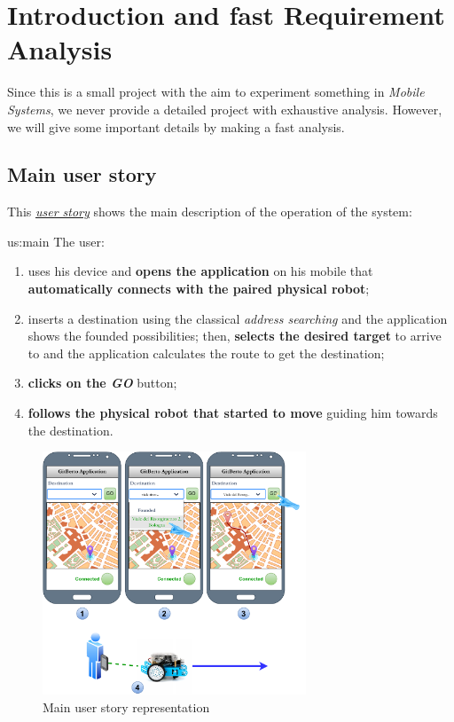 \section{Introduction and fast Requirement Analysis}

Since this is a small project with the aim to experiment something in \textit{Mobile Systems}, we never provide a detailed project with exhaustive analysis. However, we will give some important details by making a fast analysis.

\subsection{Main user story}

This \href{https://en.wikipedia.org/wiki/User_story}{\textit{user story}} shows the main description of the operation of the system:

\hspace{10pt}
\begin{center}
	\begin{userstory}{us:main}
		The user:
		\begin{enumerate}
			\item uses his device and \textbf{opens the \gitberto application} on his mobile that \textbf{automatically connects with the paired physical robot}; 
			\item inserts a destination using the classical \textit{address searching} and the application shows the founded possibilities; then, \textbf{selects the desired target} to arrive to and the application calculates the route to get the destination;
			\item \textbf{clicks on the \textit{GO}} button;
			\item  \textbf{follows the physical \gitberto robot that started to move} guiding him towards the destination.
		\end{enumerate}
		
	\end{userstory}
\end{center}
\begin{figure}[h!]
	\centering
	\includegraphics[width=0.7\textwidth]{img/user_story_main.pdf}
	\caption{Main user story representation}
	\label{fig:user_story_main}
\end{figure}

